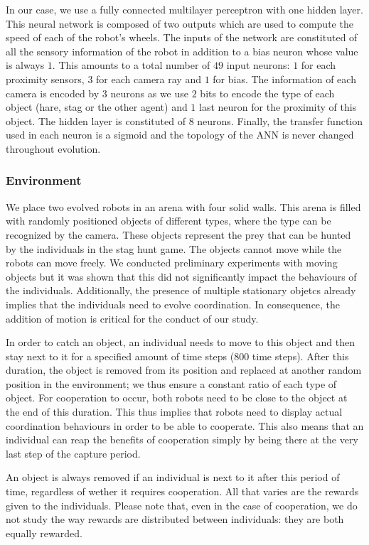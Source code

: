     In our case, we use a fully connected multilayer perceptron with one hidden layer. This neural network is composed of two outputs which are used to compute the speed of each of the robot's wheels. The inputs of the network are constituted of all the sensory information of the robot in addition to a bias neuron whose value is always $1$. This amounts to a total number of $49$ input neurons: $1$ for each proximity sensors, $3$ for each camera ray and $1$ for bias. The information of each camera is encoded by $3$ neurons as we use $2$ bits to encode the type of each object (hare, stag or the other agent) and $1$ last neuron for the proximity of this object. The hidden layer is constituted of $8$ neurons. Finally, the transfer function used in each neuron is a sigmoid and the topology of the ANN is never changed throughout evolution.

    \subsubsection{Environment} We place two evolved robots in an arena with four solid walls. This arena is filled with randomly positioned objects of different types, where the type can be recognized by the camera. These objects represent the prey that can be hunted by the individuals in the stag hunt game. The objects cannot move while the robots can move freely. We conducted preliminary experiments with moving objects but it was shown that this did not significantly impact the behaviours of the individuals. Additionally, the presence of multiple stationary objetcs already implies that the individuals need to evolve coordination. In consequence, the addition of motion is critical for the conduct of our study.

    In order to catch an object, an individual needs to move to this object and then stay next to it for a specified amount of time steps ($800$ time steps). After this duration, the object is removed from its position and replaced at another random position in the environment; we thus ensure a constant ratio of each type of object. For cooperation to occur, both robots need to be close to the object at the end of this duration. This thus implies that robots need to display actual coordination behaviours in order to be able to cooperate. This also means that an individual can reap the benefits of cooperation simply by being there at the very last step of the capture period.

    An object is always removed if an individual is next to it after this period of time, regardless of wether it requires cooperation. All that varies are the rewards given to the individuals. Please note that, even in the case of cooperation, we do not study the way rewards are distributed between individuals: they are both equally rewarded.

